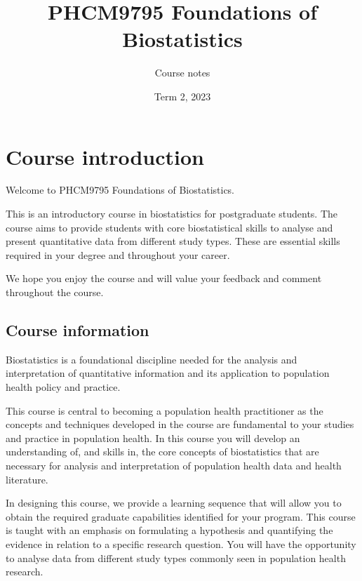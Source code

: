 \documentclass[
]{memoir}
\title{PHCM9795 Foundations of Biostatistics}
\author{Course notes}
\date{Term 2, 2023}
\begin{document}
\maketitle

{
\setcounter{tocdepth}{1}
\tableofcontents
}
\hypertarget{course-introduction}{%
\chapter*{Course introduction}\label{course-introduction}}

Welcome to PHCM9795 Foundations of Biostatistics.

This is an introductory course in biostatistics for postgraduate students. The course aims to provide students with core biostatistical skills to analyse and present quantitative data from different study types. These are essential skills required in your degree and throughout your career.

We hope you enjoy the course and will value your feedback and comment throughout the course.

\hypertarget{course-information}{%
\section*{Course information}\label{course-information}}

Biostatistics is a foundational discipline needed for the analysis and interpretation of quantitative information and its application to population health policy and practice.

This course is central to becoming a population health practitioner as the concepts and techniques developed in the course are fundamental to your studies and practice in population health. In this course you will develop an understanding of, and skills in, the core concepts of biostatistics that are necessary for analysis and interpretation of population health data and health literature.

In designing this course, we provide a learning sequence that will allow you to obtain the required graduate capabilities identified for your program. This course is taught with an emphasis on formulating a hypothesis and quantifying the evidence in relation to a specific research question. You will have the opportunity to analyse data from different study types commonly seen in population health research.
\end{document}
